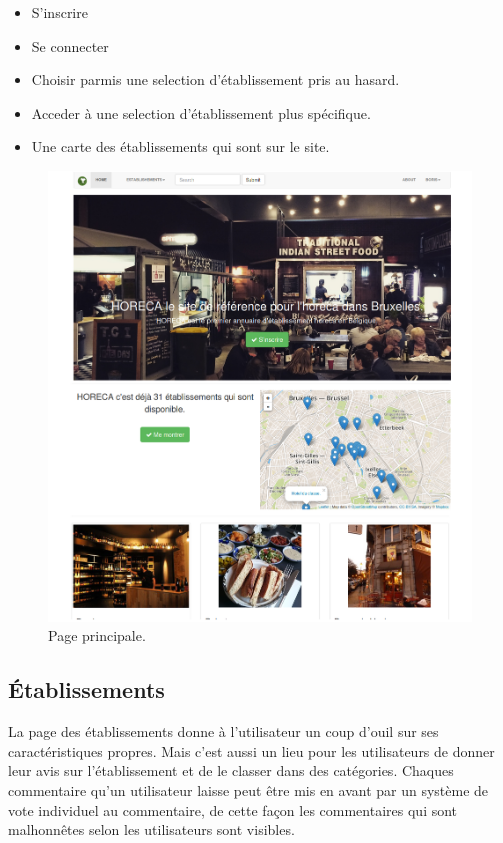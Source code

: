 \documentclass[a4paper,10pt]{article}
\begin{document}
\begin{itemize}
    \item S'inscrire
    \item Se connecter
    \item Choisir parmis une selection d'établissement pris au hasard.
    \item Acceder à une selection d'établissement plus spécifique.
    \item Une carte des établissements qui sont sur le site.
\end{itemize}

\begin{figure}[h]
  \centering
  \includegraphics[scale=0.2]{./images/main.png}
  \caption{Page principale.}
\end{figure}

\subsection{Établissements}
La page des établissements donne à l'utilisateur un coup d'ouil sur ses
caractéristiques propres. Mais c'est aussi un lieu pour les utilisateurs de
donner leur avis sur l'établissement et de le classer dans des catégories.
Chaques commentaire qu'un utilisateur laisse peut être mis en avant par un
système de vote individuel au commentaire, de cette façon les commentaires qui
sont malhonnêtes selon les utilisateurs sont visibles.
\end{document}
